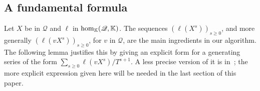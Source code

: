 \documentclass[12pt]{article}
\newcommand{\lf}{X}
\newcommand{\residueI}{\mathscr{Q}}
\def\K{\mathbb{K}}
\def\K {\ensuremath{\mathbb{K}}}
\begin{document}

\subsection{A fundamental formula}  \label{ssec:genseries}

Let $\lf$ be in $\residueI$ and $\ell$ in ${\rm hom}_\K(\residueI,\K)$.  The sequences
$(\ell(\lf^s))_{s\ge 0}$, and more generally $(\ell(v \lf^s))_{s\ge
  0}$, for $v$ in $\residueI$, are the main ingredients in our algorithm.  The
following lemma justifies this by giving an explicit form for a
generating series of the form $\sum_{s \ge 0} \ell(v
\lf^s)/T^{s+1}$. A less precise version of it is in~\cite{BoSaSc03};
the more explicit expression given here will be needed in the last
section of this paper.
\end{document}

